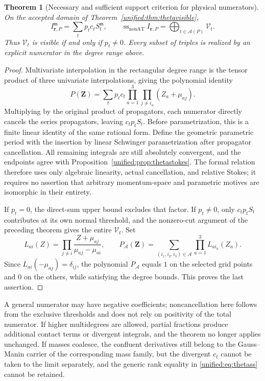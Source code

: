 \documentclass[11pt,a4paper,oneside]{article}
\theoremstyle{plain}
\newtheorem{theorem}{Theorem}[section]
\theoremstyle{definition}
\theoremstyle{remark}
\numberwithin{equation}{section}
\begin{document}
\begin{theorem}[Necessary and sufficient support criterion for physical numerators]\label{unified:thm:thetanumerator}
On the accepted domain of Theorem~\ref{unified:thm:thetavisible},
\begin{equation}\label{unified:eq:thetapinsert}
 I_{\mathbf r,P}^{\mathfrak m}=\sum_t p_tc_tS_t^{\mathfrak m},
 \qquad
 \operatorname{ss}_{\mathrm{nonAT}} I_{\mathbf r,P}
       =\bigoplus_{t\in\mathcal A(P)}\mathcal V_t .
\end{equation}
Thus $\mathcal V_t$ is visible if and only if $p_t\ne0$.
Every subset of triples is realized by an explicit numerator in the degree range above.
\end{theorem}
\begin{proof}
Multivariate interpolation in the rectangular degree range is the tensor product of three univariate interpolations, giving the polynomial identity
\[
 P(\mathbf Z)=\sum_t p_tc_t
       \prod_{a=1}^3\prod_{j\ne i_a}(Z_a+\mu_{aj}).
\]
Multiplying by the original product of propagators, each numerator directly cancels the series propagators, leaving $c_tp_tS_t$.
Before parametrization, this is a finite linear identity of the same rational form.
Define the geometric parametric period with the insertion by linear Schwinger parametrization after propagator cancellation.
All remaining integrals are still absolutely convergent, and the endpoints agree with Proposition~\ref{unified:prop:thetastokes}.
The formal relation therefore uses only algebraic linearity, actual cancellation, and relative Stokes;
it requires no assertion that arbitrary momentum-space and parametric motives are isomorphic in their entirety.

If $p_t=0$, the direct-sum upper bound excludes that factor. If $p_t\ne0$, only
$c_tp_tS_t$ contributes at its own normal threshold, and the nonzero-cut argument of the preceding theorem gives the entire $\mathcal V_t$.
Set
\[
 L_{ai}(Z)=
 \prod_{j\ne i}\frac{Z+\mu_{aj}}{\mu_{aj}-\mu_{ai}} ,
 \qquad
 P_{\mathcal A}(\mathbf Z)=
       \sum_{(i_1,i_2,i_3)\in\mathcal A}\prod_{a=1}^3L_{ai_a}(Z_a).
\]
Since $L_{ai}(-\mu_{aj})=\delta_{ij}$, the polynomial $P_{\mathcal A}$ equals $1$ on the selected grid points
and $0$ on the others, while satisfying the degree bounds. This proves the last assertion.
\end{proof}

A general numerator may have negative coefficients; noncancellation here follows from the exclusive thresholds and does not rely on positivity of the total numerator.
If higher multidegrees are allowed, partial fractions produce additional contact terms or divergent integrals,
and the theorem no longer applies unchanged. If masses coalesce, the confluent derivatives still belong to the
Gauss--Manin carrier of the corresponding mass family, but the divergent $c_t$ cannot be taken to the limit separately, and the generic rank equality
in \eqref{unified:eq:thetass} cannot be retained.
\end{document}
